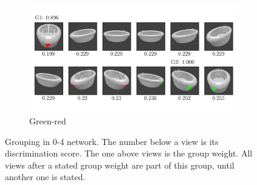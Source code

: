 \begin{figure}
\begin{subfigure}{\textwidth}
	\end{subfigure}
	\begin{subfigure}{\textwidth}
		\includegraphics[trim=10 20 10 20, clip]{images/mn-sl-0-4-20/bathtub_0107_3_grouping.png}
		\caption{Green-red}
		\label{fig:grouping-0-4-green-red}
	\end{subfigure}
	\caption[Grouping in 0-4 network]{Grouping in 0-4 network. The number below a view is its discrimination score. The one above views is the group weight. All views after a stated group weight are part of this group, until another one is stated.}
	\label{fig:grouping-0-4}
\end{figure}

